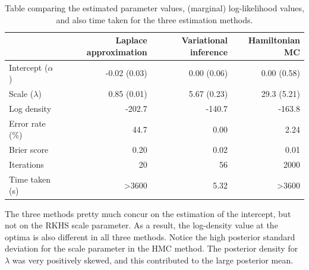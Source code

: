 \begin{table}[hbt]
\centering
\caption{Table comparing the estimated parameter values, (marginal) log-likelihood values, and also time taken for the three estimation methods.}
\label{tab:compreiprobit}
\begin{tabular}{@{}lrrr@{}}
\toprule
& Laplace approximation 
& Variational inference 
& Hamiltonian MC          \\ \midrule
Intercept ($\alpha$)      & -0.02 (0.03)           & 0.00 (0.06)    & 0.00 (0.58)  \\
Scale ($\lambda$)      & 0.85 (0.01)         & 5.67 (0.23)  & 29.3 (5.21)     \\[0.5em]
Log density    & -202.7              & -140.7       & -163.8                  \\
Error rate (\%) & 44.7               & 0.00        & 2.24                   \\
Brier score & 0.20               & 0.02        & 0.01                   \\[0.5em]
Iterations     & 20                  & 56          & 2000                    \\
Time taken (s) & >3600                & 5.32         & >3600                     \\ \bottomrule
\end{tabular}
\end{table}

The three methods pretty much concur on the estimation of the intercept, but not on the RKHS scale parameter.
As a result, the log-density value at the optima is also different in all three methods.
Notice the high posterior standard deviation for the scale parameter in the HMC method.
The posterior density for $\lambda$ was very positively skewed, and this contributed to the large posterior mean.

